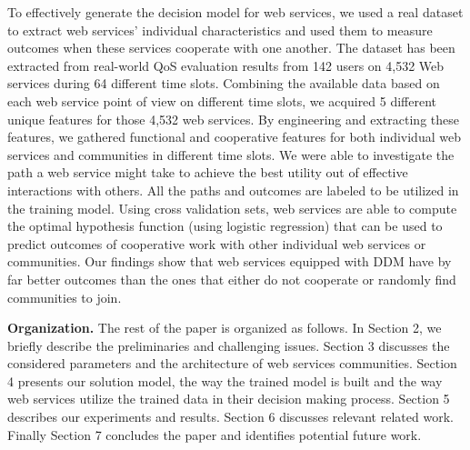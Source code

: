 \documentclass[11pt,onecolumn]{IEEEtran}
\begin{document}
To effectively generate the decision model for web services, we used a real dataset to extract web services' individual characteristics and used them to measure outcomes when these services cooperate with one another. The dataset has been extracted from real-world QoS evaluation results from 142 users on 4,532 Web services during 64 different time slots. Combining the available data based on each web service point of view on different time slots, we acquired 5 different unique features for those 4,532 web services. By engineering and extracting these features, we gathered functional and cooperative features for both individual web services and communities in different time slots. We were able to investigate the path a web service might take to achieve the best utility out of effective interactions with others. All the paths and outcomes are labeled to be utilized in the training model. Using cross validation sets, web services are able to compute the optimal hypothesis function (using logistic regression) that can be used to predict outcomes of cooperative work with other individual web services or communities. Our findings show that web services equipped with DDM have by far better outcomes than the ones that either do not cooperate or randomly find communities to join. 

\textbf{Organization.} The rest of the paper is organized as follows. In Section 2, we briefly describe the preliminaries and challenging issues. Section 3 discusses the considered parameters and the architecture of web services communities. Section 4 presents our solution model, the way the trained model is built and the way web services utilize the trained data in their decision making process. Section 5 describes our experiments and results. Section 6 discusses relevant related work. Finally Section 7 concludes the paper and identifies potential future work.


\end{document}
